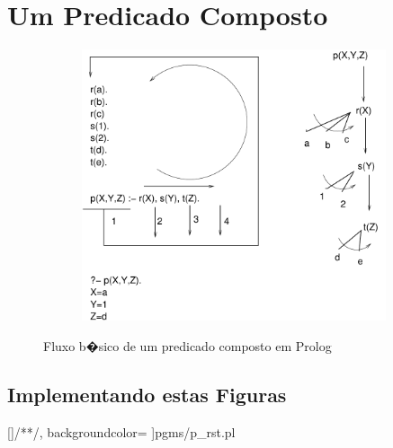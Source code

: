 \documentclass[final,a4paper]{article}
\begin{document}
\section{Um Predicado Composto}
\begin{figure}[!htb]
\centering
\includegraphics[width=14cm, height=8cm]{figuras/fluxo_pxyz.pdf}
\label{fig_fluxo_pxyz}
\caption{Fluxo b�sico de um predicado composto em Prolog}
\end{figure}

\newpage
\subsection{Implementando estas Figuras}

[\color{blue}]{/*}{*/}, %
              backgroundcolor=\color{yellow}  %
		 ]{pgms/p_rst.pl}
\end{document}
